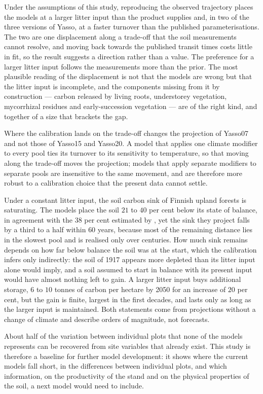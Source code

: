 \documentclass[11pt]{article}
\begin{document}
Under the assumptions of this study, reproducing the observed trajectory places the
models at a larger litter input than the product supplies and, in two of the three
versions of Yasso, at a faster turnover than the published parameterisations. The two
are one displacement along a trade-off that the soil measurements cannot resolve, and
moving back towards the published transit times costs little in fit, so the result
suggests a direction rather than a value. The preference for a larger litter input
follows the measurements more than the prior. The most plausible reading of the
displacement is not that the models are wrong but that the litter input is incomplete,
and the components missing from it by construction --- carbon released by living
roots, understorey vegetation, mycorrhizal residues and early-succession vegetation ---
are of the right kind, and together of a size that brackets the gap.

Where the calibration lands on the trade-off changes the projection of Yasso07 and not
those of Yasso15 and Yasso20. A model that applies one climate modifier to every pool
ties its turnover to its sensitivity to temperature, so that moving along the
trade-off moves the projection; models that apply separate modifiers to separate pools
are insensitive to the same movement, and are therefore more robust to a calibration
choice that the present data cannot settle.

Under a constant litter input, the soil carbon sink of Finnish upland forests is
saturating. The models place the soil $21$ to $40$ per cent below its state of balance,
in agreement with the $38$ per cent estimated by \citet{Liski2006}, yet the sink they
project falls by a third to a half within $60$ years, because most of the remaining distance
lies in the slowest pool and is realised only over centuries. How much sink remains
depends on how far below balance the soil was at the start, which the calibration infers
only indirectly: the soil of 1917 appears more depleted than its litter input alone would
imply, and a soil assumed to start in balance with its present input would have almost
nothing left to gain. A larger litter input
buys additional storage, $6$ to $10$ tonnes of carbon per hectare by 2050 for an
increase of $20$ per cent, but the gain is finite, largest in the first decades, and
lasts only as long as the larger input is maintained. Both statements come from
projections without a change of climate and describe orders of magnitude, not
forecasts.

About half of the variation between individual plots that none of the models
represents can be recovered from site variables that already exist. This study is
therefore a baseline for further model development: it shows where the current models
fall short, in the differences between individual plots, and which information, on the
productivity of the stand and on the physical properties of the soil, a next model
would need to include.
\end{document}
